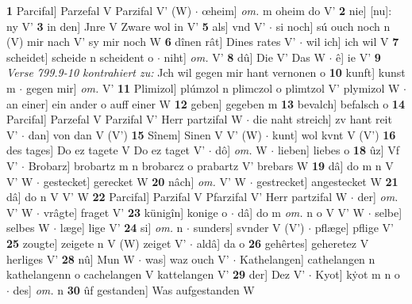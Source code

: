 \documentclass[8pt,a4paper,notitlepage]{article}
\begin{document}
\begin{table}[ht]
\begin{minipage}[t]{0.5\linewidth}
\textbf{1} Parcifal] Parzefal V Parzifal V' (W)  $\cdot$ œheim] \textit{om.} m oheim do V' \textbf{2} nie] [nu]: ny V' \textbf{3} in den] Jnre V Zware wol in V' \textbf{5} als] vnd V'  $\cdot$ si noch] sú ouch noch n (V) mir nach V' sy mir noch W \textbf{6} dînen rât] Dines rates V'  $\cdot$ wil ich] ich wil V \textbf{7} scheidet] scheide n scheident o  $\cdot$ niht] \textit{om.} V' \textbf{8} dû] Die V' Das W  $\cdot$ ê] ie V' \textbf{9} \textit{Verse 799.9-10 kontrahiert zu:} Jch wil gegen mir hant vernonen o  \textbf{10} kunft] kunst m  $\cdot$ gegen mir] \textit{om.} V' \textbf{11} Plimizol] plúmzol n plimczol o plimtzol V' plymizol W  $\cdot$ an einer] ein ander o auff einer W \textbf{12} geben] gegeben m \textbf{13} bevalch] befalsch o \textbf{14} Parcifal] Parzefal V Parzifal V' Herr partzifal W  $\cdot$ die naht streich] zv hant reit V'  $\cdot$ dan] von dan V (V') \textbf{15} Sînem] Sinen V V' (W)  $\cdot$ kunt] wol kvnt V (V') \textbf{16} des tages] Do ez tagete V Do ez taget V'  $\cdot$ dô] \textit{om.} W  $\cdot$ lieben] liebes o \textbf{18} ûz] Vf V'  $\cdot$ Brobarz] brobartz m n brobarcz o prabartz V' brebars W \textbf{19} dâ] do m n V V' W  $\cdot$ gestecket] gerecket W \textbf{20} nâch] \textit{om.} V' W  $\cdot$ gestrecket] angestecket W \textbf{21} dâ] do n V V' W \textbf{22} Parcifal] Parzifal V Pfarzifal V' Herr partzifal W  $\cdot$ der] \textit{om.} V' W  $\cdot$ vrâgte] fraget V' \textbf{23} künigîn] konige o  $\cdot$ dâ] do m \textit{om.} n o V V' W  $\cdot$ selbe] selbes W  $\cdot$ læge] lige V' \textbf{24} si] \textit{om.} n  $\cdot$ sunders] svnder V (V')  $\cdot$ pflæge] pflige V' \textbf{25} zougte] zeigete n V (W) zeiget V'  $\cdot$ aldâ] da o \textbf{26} gehêrtes] geheretez V herliges V' \textbf{28} nû] Mun W  $\cdot$ was] waz ouch V'  $\cdot$ Kathelangen] cathelangen n kathelangenn o cachelangen V kattelangen V' \textbf{29} der] Dez V'  $\cdot$ Kyot] kẏot m n o  $\cdot$ des] \textit{om.} n \textbf{30} ûf gestanden] Was aufgestanden W \newline
\end{minipage}
\end{table}
\newpage
\end{document}
